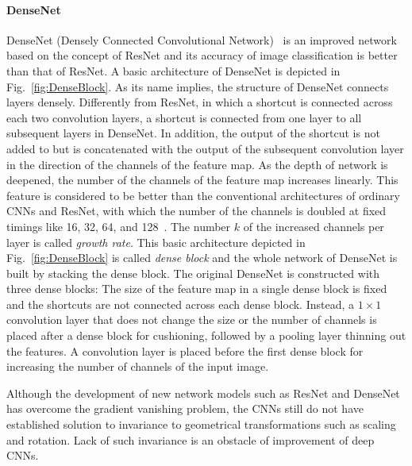 \documentclass[journal]{IEEEtran}
\begin{document}
\paragraph*{\textbf{DenseNet}}
DenseNet (Densely Connected Convolutional Network)~\cite{Huang2016b} is an improved network based on the concept of ResNet and its accuracy of image classification is better than that of ResNet.
A basic architecture of DenseNet is depicted in Fig.~\ref{fig:DenseBlock}.
As its name implies, the structure of DenseNet connects layers densely.
Differently from ResNet, in which a shortcut is connected across each two convolution layers, a shortcut is connected from one layer to all subsequent layers in DenseNet.
In addition, the output of the shortcut is not added to but is concatenated with the output of the subsequent convolution layer in the direction of the channels of the feature map.
As the depth of network is deepened, the number of the channels of the feature map increases linearly.
This feature is considered to be better than the conventional architectures of ordinary CNNs and ResNet, with which the number of the channels is doubled at fixed timings like 16, 32, 64, and 128~\cite{Huang2016b}.
The number $k$ of the increased channels per layer is called \emph{growth rate}.
This basic architecture depicted in Fig.~\ref{fig:DenseBlock} is called \emph{dense block} and the whole network of DenseNet is built by stacking the dense block.
The original DenseNet is constructed with three dense blocks: The size of the feature map in a single dense block is fixed and the shortcuts are not connected across each dense block.
Instead, a $1\times1$ convolution layer that does not change the size or the number of channels is placed after a dense block for cushioning, followed by a pooling layer thinning out the features.
A convolution layer is placed before the first dense block for increasing the number of channels of the input image.

Although the development of new network models such as ResNet and DenseNet has overcome the gradient vanishing problem, the CNNs still do not have established solution to invariance to geometrical transformations such as scaling and rotation.
Lack of such invariance is an obstacle of improvement of deep CNNs.
\end{document}
